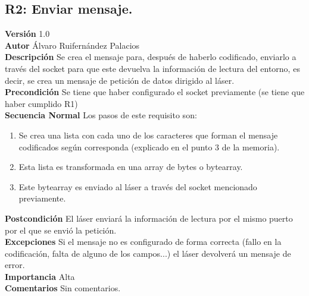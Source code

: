 \subsection{R2: Enviar mensaje.}
\textbf{Versión} 1.0\\
\textbf{Autor} Álvaro Ruifernández Palacios\\
\textbf{Descripción} Se crea el mensaje para, después de haberlo codificado, enviarlo a través del socket para que este devuelva la información de lectura del entorno, es decir, se crea un mensaje de petición de datos dirigido al láser.\\
\textbf{Precondición} Se tiene que haber configurado el socket previamente (se tiene que haber cumplido R1)\\
\textbf{Secuencia Normal} Los pasos de este requisito son:
\begin{enumerate}
	\item Se crea una lista con cada uno de los caracteres que forman el mensaje codificados según corresponda (explicado en el punto 3 de la memoria).
	\item Esta lista es transformada en una array de bytes o bytearray.
	\item Este bytearray es enviado al láser a través del socket mencionado previamente.
\end{enumerate}
\textbf{Postcondición} El láser enviará la información de lectura por el mismo puerto por el que se envió la petición.\\
\textbf{Excepciones} Si el mensaje no es configurado de forma correcta (fallo en la codificación, falta de alguno de los campos...) el láser devolverá un mensaje de error.\\
\textbf{Importancia} Alta\\
\textbf{Comentarios} Sin comentarios.\\

